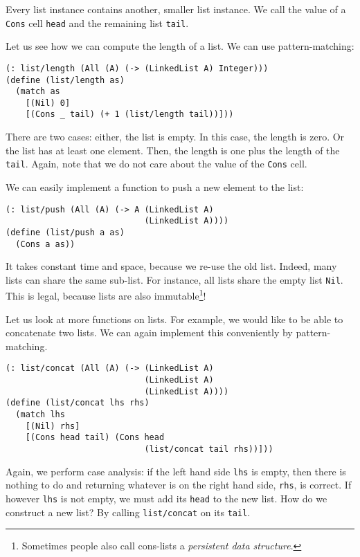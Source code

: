 \documentclass{article}
\begin{document}
Every list instance contains another, smaller list instance. We call the value of a \lstinline{Cons} cell \lstinline{head} and the remaining list \lstinline{tail}.

Let us see how we can compute the length of a list. We can use pattern-matching:

\begin{lstlisting}
(: list/length (All (A) (-> (LinkedList A) Integer)))
(define (list/length as)
  (match as
    [(Nil) 0]
    [(Cons _ tail) (+ 1 (list/length tail))]))
\end{lstlisting}

There are two cases: either, the list is empty. In this case, the length is zero. Or the list has at least one element. Then, the length is one plus the length of the \lstinline{tail}. Again, note that we do not care about the value of the \lstinline{Cons} cell.

We can easily implement a function to push a new element to the list:

\begin{lstlisting}
(: list/push (All (A) (-> A (LinkedList A)
                            (LinkedList A))))
(define (list/push a as)
  (Cons a as))
\end{lstlisting}

It takes constant time and space, because we re-use the old list. Indeed, many lists can share the same sub-list. For instance, all lists share the empty list \lstinline{Nil}. This is legal, because lists are also immutable\footnote{Sometimes people also call cons-lists a \emph{persistent data structure}.}!

Let us look at more functions on lists. For example, we would like to be able to concatenate two lists. We can again implement this conveniently by pattern-matching.

\begin{lstlisting}
(: list/concat (All (A) (-> (LinkedList A)
                            (LinkedList A)
                            (LinkedList A))))
(define (list/concat lhs rhs)
  (match lhs
    [(Nil) rhs]
    [(Cons head tail) (Cons head
                            (list/concat tail rhs))]))
\end{lstlisting}

Again, we perform case analysis: if the left hand side \lstinline{lhs} is empty, then there is nothing to do and returning whatever is on the right hand side, \lstinline{rhs}, is correct. If however \lstinline{lhs} is not empty, we must add its \lstinline{head} to the new list. How do we construct a new list? By calling \lstinline{list/concat} on its \lstinline{tail}.
\end{document}
